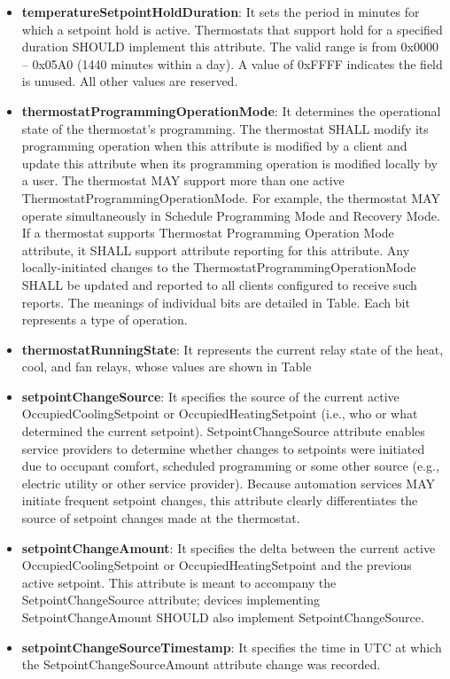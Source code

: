 \begin{itemize}
\item \textbf{temperatureSetpointHoldDuration}: It sets the period in minutes for which a setpoint hold is active. Thermostats that support hold for a specified duration SHOULD implement this attribute. The valid range is from 0x0000 – 0x05A0 (1440 minutes within a day). A value of 0xFFFF indicates the field is unused. All other values are reserved.
\item \textbf{thermostatProgrammingOperationMode}: It determines the operational state of the thermostat’s programming. The thermostat SHALL modify its programming operation when this attribute is modified by a client and update this attribute when its programming operation is modified locally by a user. The thermostat MAY support more than one active ThermostatProgrammingOperationMode. For example, the thermostat MAY operate simultaneously in Schedule Programming Mode and Recovery Mode. If a thermostat supports Thermostat Programming Operation Mode attribute, it SHALL support attribute reporting for this attribute. Any locally-initiated changes to the ThermostatProgrammingOperationMode SHALL be updated and reported to all clients configured to receive such reports. The meanings of individual bits are detailed in Table. Each bit represents a type of operation.
\item \textbf{thermostatRunningState}: It represents the current relay state of the heat, cool, and fan relays, whose values are shown in Table
\item \textbf{setpointChangeSource}: It  specifies the source of the current active OccupiedCoolingSetpoint or OccupiedHeatingSetpoint (i.e., who or what determined the current setpoint). SetpointChangeSource attribute enables service providers to determine whether changes to setpoints were initiated due to occupant comfort, scheduled programming or some other source (e.g., electric utility or other service provider). Because automation services MAY initiate frequent setpoint changes, this attribute clearly differentiates the source of setpoint changes made at the thermostat.
\item \textbf{setpointChangeAmount}: It specifies the delta between the current active OccupiedCoolingSetpoint or OccupiedHeatingSetpoint and the previous active setpoint. This attribute is meant to accompany the SetpointChangeSource attribute; devices implementing SetpointChangeAmount SHOULD also implement SetpointChangeSource.
\item \textbf{setpointChangeSourceTimestamp}: It specifies the time in UTC at which the SetpointChangeSourceAmount attribute change was recorded.

\end{itemize}
